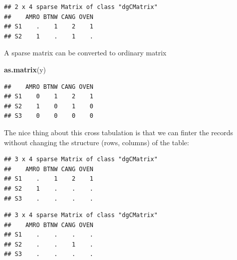 \documentclass[12pt,]{scrbook}
\newenvironment{Shaded}{\begin{snugshade}}{\end{snugshade}}
\newcommand{\KeywordTok}[1]{\textcolor[rgb]{0.13,0.29,0.53}{\textbf{#1}}}
\newcommand{\NormalTok}[1]{#1}
\newcommand{\OperatorTok}[1]{\textcolor[rgb]{0.81,0.36,0.00}{\textbf{#1}}}
\newcommand{\StringTok}[1]{\textcolor[rgb]{0.31,0.60,0.02}{#1}}
\begin{document}
\begin{verbatim}
## 2 x 4 sparse Matrix of class "dgCMatrix"
##    AMRO BTNW CANG OVEN
## S1    .    1    2    1
## S2    1    .    1    .
\end{verbatim}

A sparse matrix can be converted to ordinary matrix

\begin{Shaded}
\begin{Highlighting}[]
\KeywordTok{as.matrix}\NormalTok{(y)}
\end{Highlighting}
\end{Shaded}

\begin{verbatim}
##    AMRO BTNW CANG OVEN
## S1    0    1    2    1
## S2    1    0    1    0
## S3    0    0    0    0
\end{verbatim}

The nice thing about this cross tabulation is that we can finter the records without
changing the structure (rows, columns) of the table:

\begin{Shaded}
\end{Shaded}

\begin{verbatim}
## 3 x 4 sparse Matrix of class "dgCMatrix"
##    AMRO BTNW CANG OVEN
## S1    .    1    2    1
## S2    1    .    .    .
## S3    .    .    .    .
\end{verbatim}

\begin{Shaded}
\end{Shaded}

\begin{verbatim}
## 3 x 4 sparse Matrix of class "dgCMatrix"
##    AMRO BTNW CANG OVEN
## S1    .    .    .    .
## S2    .    .    1    .
## S3    .    .    .    .
\end{verbatim}
\end{document}
